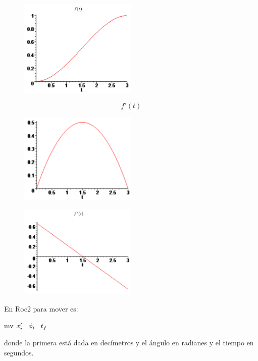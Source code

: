 \begin{figure}[h!]
	\centering
	\includegraphics[width=0.5\textwidth]{images/img66.png}
	\label{figura66}
\end{figure}


$$
f'(t)$$
\begin{figure}[h!]
	\centering
	\includegraphics[width=0.5\textwidth]{images/img67.png}
	\label{figura67}
\end{figure}


\begin{figure}[h!]
	\centering
	\includegraphics[width=0.5\textwidth]{images/img68.png}
	\label{figura68}
\end{figure}


En Roc2 para mover es:

mv $x'_i \hspace{0.3cm} \phi_i\hspace{0.3cm}t_f$

donde la primera está dada en decímetros y el ángulo en radianes y el tiempo en segundos.


